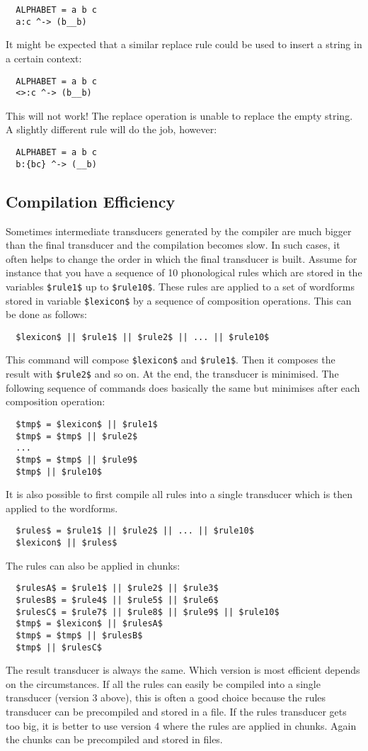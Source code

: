 \documentclass{article}
\begin{document}
\begin{verbatim}
  ALPHABET = a b c
  a:c ^-> (b__b)
\end{verbatim}

It might be expected that a similar replace rule could be used to
insert a string in a certain context:
\begin{verbatim}
  ALPHABET = a b c
  <>:c ^-> (b__b)
\end{verbatim}
This will not work! The replace operation is unable to replace the
empty string. A slightly different rule will do the job, however:
\begin{verbatim}
  ALPHABET = a b c
  b:{bc} ^-> (__b)
\end{verbatim}

\subsection{Compilation Efficiency}

Sometimes intermediate transducers generated by the compiler are much
bigger than the final transducer and the compilation becomes slow. In
such cases, it often helps to change the order in which the final
transducer is built. Assume for instance that you have a sequence of
10 phonological rules which are stored in the variables
\texttt{\$rule1\$} up to \texttt{\$rule10\$}. These rules are applied
to a set of wordforms stored in variable \texttt{\$lexicon\$} by a
sequence of composition operations. This can be done as follows:
\begin{verbatim}
  $lexicon$ || $rule1$ || $rule2$ || ... || $rule10$
\end{verbatim}
This command will compose \texttt{\$lexicon\$} and
\texttt{\$rule1\$}. Then it composes the result with
\texttt{\$rule2\$} and so on. At the end, the transducer is minimised.
The following sequence of commands does basically the same but minimises
after each composition operation:
\begin{verbatim}
  $tmp$ = $lexicon$ || $rule1$
  $tmp$ = $tmp$ || $rule2$
  ...
  $tmp$ = $tmp$ || $rule9$
  $tmp$ || $rule10$
\end{verbatim}
It is also possible to first compile all rules into a single
transducer which is then applied to the wordforms.
\begin{verbatim}
  $rules$ = $rule1$ || $rule2$ || ... || $rule10$
  $lexicon$ || $rules$
\end{verbatim}
The rules can also be applied in chunks:
\begin{verbatim}
  $rulesA$ = $rule1$ || $rule2$ || $rule3$
  $rulesB$ = $rule4$ || $rule5$ || $rule6$
  $rulesC$ = $rule7$ || $rule8$ || $rule9$ || $rule10$
  $tmp$ = $lexicon$ || $rulesA$
  $tmp$ = $tmp$ || $rulesB$
  $tmp$ || $rulesC$
\end{verbatim}
The result transducer is always the same. Which version is most
efficient depends on the circumstances. If all the rules can easily be
compiled into a single transducer (version 3 above), this is often a
good choice because the rules transducer can be precompiled and stored
in a file. If the rules transducer gets too big, it is better to use
version 4 where the rules are applied in chunks. Again the chunks can
be precompiled and stored in files.




\end{document}
